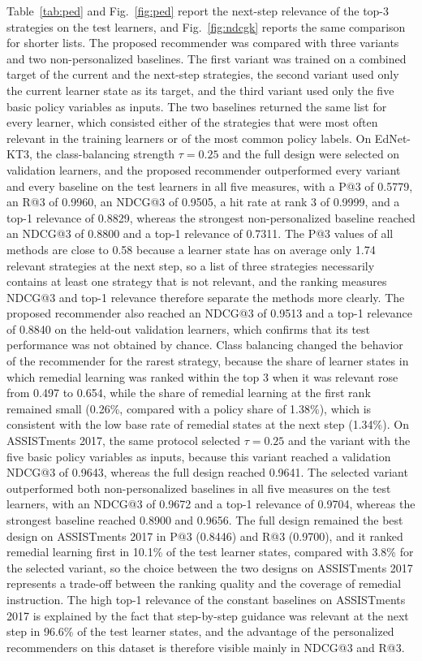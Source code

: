 \documentclass[11pt]{article}
\begin{document}
Table~\ref{tab:ped} and Fig.~\ref{fig:ped} report the next-step relevance of the top-3 strategies on the test learners, and Fig.~\ref{fig:ndcgk} reports the same comparison for shorter lists. The proposed recommender was compared with three variants and two non-personalized baselines. %
The first variant was trained on a combined target of the current and the next-step strategies, the second variant used only the current learner state as its target, and the third variant used only the five basic policy variables as inputs. The two baselines returned the same list for every learner, which consisted either of the strategies that were most often relevant in the training learners or of the most common policy labels. On EdNet-KT3, the class-balancing strength $\tau = 0.25$ and the full design were selected on validation learners, and the proposed recommender outperformed every variant and every baseline on the test learners in all five measures, with a P@3 of 0.5779, an R@3 of 0.9960, an NDCG@3 of 0.9505, a hit rate at rank 3 of 0.9999, and a top-1 relevance of 0.8829, whereas the strongest non-personalized baseline reached an NDCG@3 of 0.8800 and a top-1 relevance of 0.7311. The P@3 values of all methods are close to 0.58 because a learner state has on average only 1.74 relevant strategies at the next step, so a list of three strategies necessarily contains at least one strategy that is not relevant, and the ranking measures NDCG@3 and top-1 relevance therefore separate the methods more clearly. The proposed recommender also reached an NDCG@3 of 0.9513 and a top-1 relevance of 0.8840 on the held-out validation learners, which confirms that its test performance was not obtained by chance. Class balancing changed the behavior of the recommender for the rarest strategy, because the share of learner states in which remedial learning was ranked within the top 3 when it was relevant rose from 0.497 to 0.654, while the share of remedial learning at the first rank remained small (0.26\%, compared with a policy share of 1.38\%), which is consistent with the low base rate of remedial states at the next step (1.34\%). On ASSISTments 2017, the same protocol selected $\tau = 0.25$ and the variant with the five basic policy variables as inputs, because this variant reached a validation NDCG@3 of 0.9643, whereas the full design reached 0.9641. The selected variant outperformed both non-personalized baselines in all five measures on the test learners, with an NDCG@3 of 0.9672 and a top-1 relevance of 0.9704, whereas the strongest baseline reached 0.8900 and 0.9656. The full design remained the best design on ASSISTments 2017 in P@3 (0.8446) and R@3 (0.9700), and it ranked remedial learning first in 10.1\% of the test learner states, compared with 3.8\% for the selected variant, so the choice between the two designs on ASSISTments 2017 represents a trade-off between the ranking quality and the coverage of remedial instruction. The high top-1 relevance of the constant baselines on ASSISTments 2017 is explained by the fact that step-by-step guidance was relevant at the next step in 96.6\% of the test learner states, and the advantage of the personalized recommenders on this dataset is therefore visible mainly in NDCG@3 and R@3.
\end{document}
